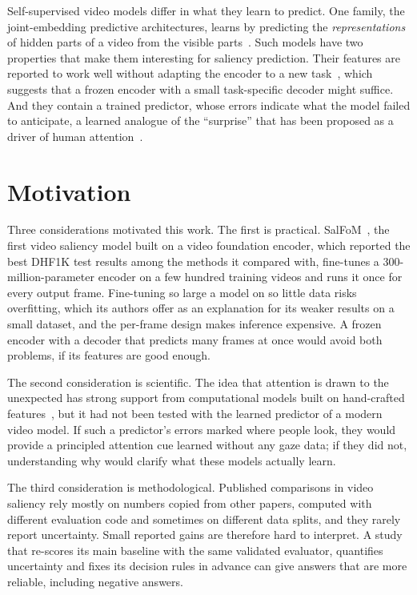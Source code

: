 Self-supervised video models differ in what they learn to predict. One family,
the joint-embedding predictive architectures, learns by predicting the
\emph{representations} of hidden parts of a video from the visible
parts~\cite{assran2023self,bardes2024revisiting}. Such models have two
properties that make them interesting for saliency prediction. Their features
are reported to work well without adapting the encoder to a new
task~\cite{bardes2024revisiting}, which suggests that a frozen encoder with a
small task-specific decoder might suffice. And they contain a trained predictor,
whose errors indicate what the model failed to anticipate, a learned analogue of
the \enquote{surprise} that has been proposed as a driver of human
attention~\cite{itti2009bayesian}.

\section{Motivation}\label{sec:motivation}


Three considerations motivated this work. The first is practical.
SalFoM~\cite{moradi2024salfom}, the first video saliency model built on a video
foundation encoder, which reported the best DHF1K test results among the methods
it compared with, fine-tunes a 300-million-parameter encoder on a few hundred
training videos and runs it once for every output frame. Fine-tuning
so large a model on so little data risks overfitting, which its authors offer as
an explanation for its weaker results on a small dataset, and the per-frame
design makes inference expensive. A frozen encoder with a decoder that predicts
many frames at once would avoid both problems, if its features are good enough.

The second consideration is scientific. The idea that attention is drawn to the
unexpected has strong support from computational models built on hand-crafted
features~\cite{itti2009bayesian}, but it had not been tested with the learned
predictor of a modern video model. If such a predictor's errors marked where
people look, they would provide a principled attention cue learned without any
gaze data; if they did not, understanding why would clarify what these models
actually learn.

The third consideration is methodological. Published comparisons in video
saliency rely mostly on numbers copied from other papers, computed with
different evaluation code and sometimes on different data splits, and they
rarely report uncertainty. Small reported gains are therefore hard to interpret.
A study that re-scores its main baseline with the same validated evaluator,
quantifies uncertainty and fixes its decision rules in advance can give answers
that are more reliable, including negative answers.

